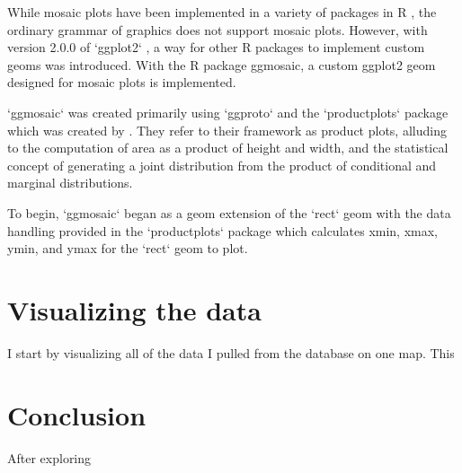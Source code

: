 \documentclass[DIV=calc, paper=a4, fontsize=10pt, twocolumn]{scrartcl}	 %
\begin{document}
While mosaic plots have been implemented in a variety of packages in R \citep{R2016}, the ordinary grammar of graphics does not support mosaic plots. However, with version 2.0.0 of `ggplot2` \citep{ggplot2}, a way for other R packages to implement custom geoms was introduced. With the R package ggmosaic, a custom ggplot2 geom designed for mosaic plots is implemented.

`ggmosaic` was created primarily using `ggproto` and the `productplots` package
 which was created by \citet{productplots, ieee-prodplots}. They refer to their framework as product plots, alluding to the computation of area as a product of height and width, and the statistical concept of generating a joint distribution from the product of conditional and marginal distributions.

To begin, `ggmosaic` began as a geom extension of the `rect` geom with the data handling provided in the `productplots` package which calculates xmin, xmax, ymin, and ymax for the `rect` geom to plot.

\section*{Visualizing the data}

I start by visualizing all of the data I pulled from the database on one map. This

\section*{Conclusion}

After exploring



\end{document}
